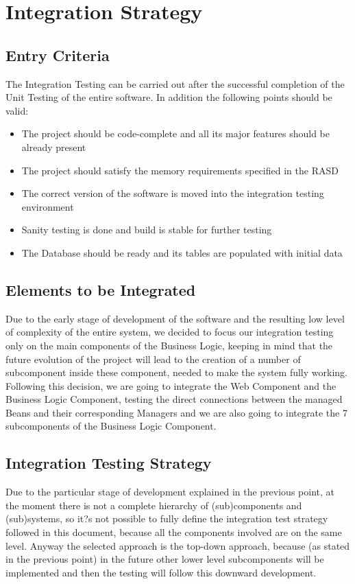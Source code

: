 \chapter{Integration Strategy} \label{chap2}

\section{Entry Criteria}
The Integration Testing can be carried out after the successful completion of the Unit Testing of the entire software. In addition the following points should be valid:

\begin{itemize}
	\item The project should be code-complete and all its major features should be already present
	\item The project should satisfy the memory requirements specified in the RASD
	\item The correct version of the software is moved into the integration testing environment
	\item Sanity testing is done and build is stable for further testing
	\item The Database should be ready and its tables are populated with initial data
\end{itemize}

\section{Elements to be Integrated}
Due to the early stage of development of the software and the resulting low level of complexity of the entire system, we decided to focus our integration testing only on the main components of the Business Logic, keeping in mind that the future evolution of the project will lead to the creation of a number of subcomponent inside these component, needed to make the system fully working. Following this decision, we are going to integrate the Web Component and the Business Logic Component, testing the direct connections between the managed Beans and their corresponding Managers and we are also going to integrate the 7 subcomponents of the Business Logic Component.

\section{Integration Testing Strategy}
Due to the particular stage of development explained in the previous point, at the moment there is not a complete hierarchy of (sub)components and (sub)systems, so it?s not possible to fully define the integration test strategy followed in this document, because all the components involved are on the same level. Anyway the selected approach is the top-down approach, because (as stated in the previous point) in the future other lower level subcomponents will be implemented and then the testing will follow this downward development.

